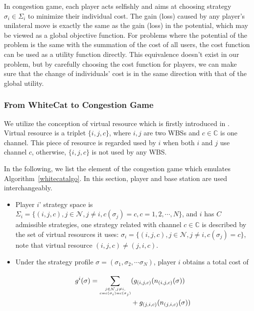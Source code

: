 \documentclass[times]{ettauth}
\theoremstyle{mytheoremstyle}
\theoremstyle{mytheoremstyle}
\theoremstyle{mytheoremstyle}
\begin{document}
%
%
In congestion game, each player acts selfishly and aims at choosing strategy $\sigma_i\in \Sigma_i$ to minimize their individual cost.
The gain (loss) caused by any player's unilateral move is exactly the same as the gain (loss) in the potential, which may be viewed as a global objective function.
For problems where the potential of the problem is the same with the summation of the cost of all users, the cost function can be used as a utility function directly.
This equivalence doesn't exist in our problem, but by carefully choosing the cost function for players, we can make sure that the change of individuals' cost is in the same direction with that of the global utility.



\subsubsection{From WhiteCat to Congestion Game}
\label{gameforproblem}
We utilize the conception of virtual resource which is firstly introduced in \cite{allerton08_liu}. 
Virtual resource is a triplet $\{i, j, c\}$, where $i,j$ are two WBSs and $c\in \mathbb{C}$ is one channel.
This piece of resource is regarded used by $i$ when both $i$ and $j$ use channel $c$, otherwise, $\{i, j, c\}$ is not used by any WBS.

In the following, we list the element of the congestion game which emulates Algorithm~\ref{whitecatalgo}.
In this section, player and base station are used interchangeably.

\begin{itemize}
\item Player $i$' strategy space is $\Sigma_i=\{(i,j,c), j\in \mathcal{N}, j\ne i, c(\sigma_j)=c, c=1,2,\cdots,N\}$, and $i$ has $C$ admissible strategies, one strategy related with channel $c\in\mathbb{C}$ is described by the set of virtual resources it uses: $\sigma_i=\{(i,j,c), j\in \mathcal{N}, j\ne i, c(\sigma_j)=c\}$, note that virtual resource $(i,j,c)\neq(j,i,c)$.

\item Under the strategy profile $\sigma=(\sigma_1, \sigma_2, \cdots \sigma_N)$, player $i$ obtains a total cost of 

	\begin{equation}
\label{6}
		\begin{split}
		g^i(\sigma)= \sum\limits^{}_{\tiny\substack{j\in \mathcal{N},j\neq i,\\ c=c(\sigma_i)=c(\sigma_j)}} &(g_{(i,j,c)}(n_{(i,j,c)}(\sigma))\\&+g_{(j,i,c)}(n_{(j,i,c)}(\sigma))
		\end{split}
		\end{equation}
\end{itemize}
\end{document}
